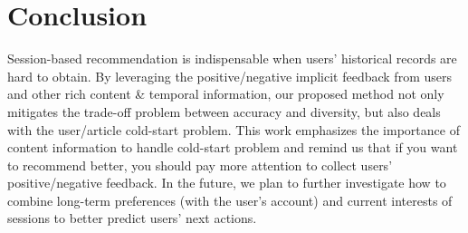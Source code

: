\section{Conclusion}

Session-based recommendation is indispensable when users' historical records are hard to obtain. By leveraging the positive/negative implicit feedback from users and other rich content \& temporal information, our proposed method not only mitigates the trade-off problem between accuracy and diversity, but also deals with the user/article cold-start problem. This work emphasizes the importance of content information to handle cold-start problem and remind us that if you want to recommend better, you should pay more attention to collect users' positive/negative feedback. In the future, we plan to further investigate how to combine long-term preferences (with the user's  account) and current interests of sessions to better predict users' next actions.
